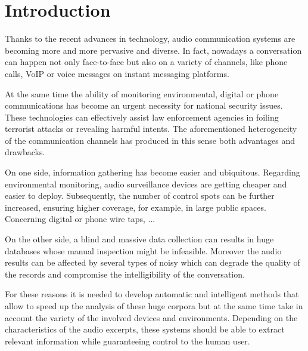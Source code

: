 \section{Introduction}\label{sec:intro}

Thanks to the recent advances in technology, audio communication systems are becoming more and more pervasive and diverse. In fact, nowadays a conversation can happen not only face-to-face but also on a variety of channels, like phone calls, VoIP or voice messages on instant messaging platforms.  

At the same time the ability of monitoring environmental, digital or phone communications has become an urgent necessity for national security issues. These technologies can effectively assist law enforcement agencies in foiling terrorist attacks or revealing harmful intents. The aforementioned heterogeneity of the communication channels has produced in this sense both advantages and drawbacks.  


On one side, information gathering has become easier and ubiquitous. Regarding environmental monitoring, audio surveillance devices are getting cheaper and easier to deploy. Subsequently, the number of control spots can be further increased, ensuring higher coverage, for example, in large public spaces. Concerning digital or phone wire taps, ...


On the other side, a blind and massive data collection can results in huge databases whose manual inspection might be infeasible. Moreover the audio results can be affected by several types of noisy which can degrade the quality of the records and compromise the intelligibility of the conversation.


For these reasons it is needed to develop automatic and intelligent methods that allow to speed up the analysis of these huge corpora but at the same time take in account the variety of the involved devices and environments. Depending on the characteristics of the audio excerpts, these systems should be able to extract relevant information while guaranteeing control to the human user.


